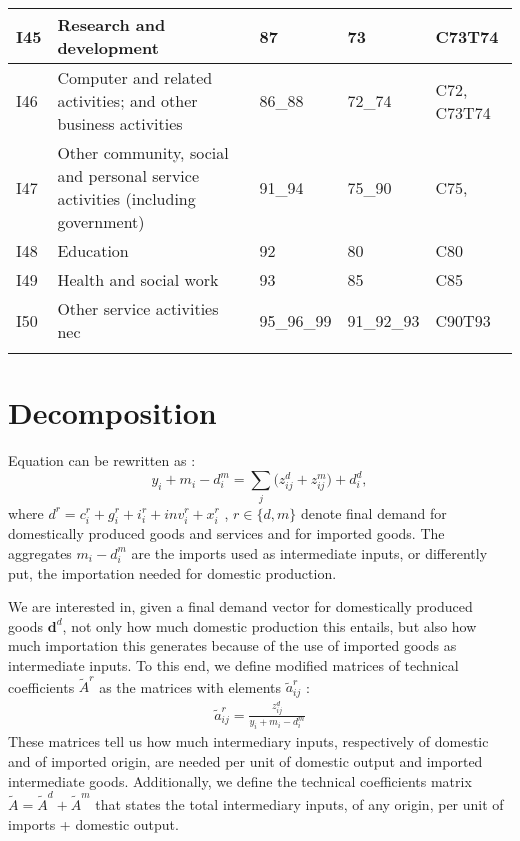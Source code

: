 \documentclass[12pt,english]{article}
\begin{document}
\begin{table}[ht]
\begin{adjustbox}{width=\textwidth}
\begin{tabular}{lp{500pt}lll}
		I45 & Research and development  & 87 & 73 & C73T74 \\ \midrule
		I46 & Computer and related activities; and other business activities & 86\_88 & 72\_74 & C72, C73T74 \\ \midrule
		I47 & Other community, social and personal service activities (including government) & 91\_94 & 75\_90 & C75,  \\ \midrule
		I48 & Education & 92 & 80 & C80 \\ \midrule
		I49 & Health and social work & 93 & 85 & C85 \\ \midrule
		I50 & Other service activities nec & 95\_96\_99 & 91\_92\_93 & C90T93 \\
		\arrayrulecolor{black}\bottomrule	
	\end{tabular}
	\end{adjustbox}
	\thispagestyle{empty}
\end{table}

\clearpage
\section{Decomposition}

Equation \label{allUSes} can be rewritten as :
\begin{equation}
y_i + m_i - d_i^m= \sum_j \big(z_{ij}^d + z_{ij}^m \big) + d_i^d, 
\end{equation}
where $d^r = c^r_i + g_i^r + i_i^r + inv_i^r + x_i^r$ , $r\in\{d,m\}$ denote final demand for domestically produced goods and services and for imported goods. The aggregates $m_i - d_i^m$ are the imports used as intermediate inputs, or differently put, the importation needed for domestic production.

We are interested in, given a final demand vector for domestically produced goods $\boldsymbol{d}^d$, not only how much domestic production this entails, but also how much importation this generates because of the use of imported goods as intermediate inputs. To this end, we define modified matrices of technical coefficients $\tilde{A}^r$ as the matrices with elements $\tilde{a}^r_{ij}$ : 
\begin{align}
\tilde{a}^r_{ij} = \frac{z_{ij}^d}{y_i + m_i - d_i^m}
\end{align}
These matrices tell us how much intermediary inputs, respectively of domestic and of imported origin, are needed per unit of domestic output and imported intermediate goods. Additionally, we define the technical coefficients matrix $\tilde{A}= \tilde{A}^d + \tilde{A}^m$ that states the total intermediary inputs, of any origin, per unit of imports + domestic output.
\end{document}
